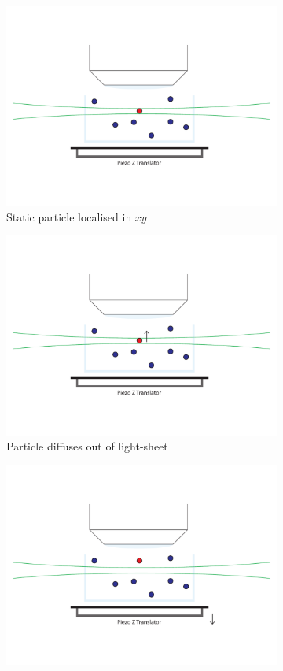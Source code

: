 \begin{figure}
	\centering
	\begin{subfigure}[b]{0.35\linewidth}
		\centering
		\includegraphics[width=0.8\linewidth]{Chapters/spt/Figs/PDF/tracking/1_piezo_track}
		\caption{Static particle localised in \(xy\)}
		\label{fig:SPIMSPT1}
	\end{subfigure}
        \hspace{0.05\linewidth}
	\begin{subfigure}[b]{0.35\linewidth}
		\centering
		\includegraphics[width=0.8\linewidth]{Chapters/spt/Figs/PDF/tracking/2_piezo_track}
		\caption{Particle diffuses out of light-sheet}
		\label{fig:SPIMSPT2}
	\end{subfigure}
	\begin{subfigure}[b]{0.35\linewidth}
		\centering
		\includegraphics[width=0.8\linewidth]{Chapters/spt/Figs/PDF/tracking/3_piezo_track}

\end{subfigure}
\end{figure}
